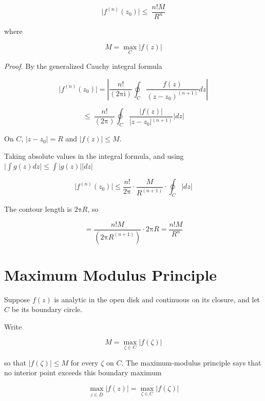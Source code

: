 \documentclass[11pt,a4paper]{article}
\theoremstyle{definition}
\theoremstyle{plain}
\begin{document}
\begin{equation}
\vert{}f^{(n)}(z_{0})\vert{} \le \ \frac{n!M}{R^{n}}
\end{equation}

where

\begin{equation}
M = \max_{C}\vert{}f(z)\vert{}
\end{equation}

\textit{Proof.} By the generalized Cauchy integral formula

\[
\vert{}f^{(n)}(z_{0})\vert{} = \left\vert{}\frac{n!}{(2\mathrm{\pi}\mathrm{i})}\oint_{C}\frac{f(z)}{(z - z_{0})^{(n + 1)}}dz\right\vert{}
\]

\[
\le \ \frac{n!}{(2\mathrm{\pi})}\oint_{C}\frac{\vert{}f(z)\vert{}}{\vert{}z - z_{0}\vert{}^{(n + 1)}}\vert{}dz\vert{}
\]

On $C$, $\vert{}z - z_{0}\vert{} = R$ and $\vert{}f(z)\vert{} \le M$.

Taking absolute values in the integral formula, and using $\vert{}\int g(z)dz\vert{} \le \int\vert{}g(z)\vert{}\vert{}dz\vert{}$

\[
\vert{}f^{(n)}(z_{0})\vert{} \le \frac{n!}{2\mathrm{\pi}} \cdot \frac{M}{R^{(n + 1)}} \cdot \oint_{C}\vert{}dz\vert{}
\]

The contour length is $2\mathrm{\pi}R$, so

\[
= \frac{n!M}{(2\mathrm{\pi}R^{(n + 1)})} \cdot 2\mathrm{\pi}R = \frac{n!M}{R^{n}}
\]

\section{Maximum Modulus Principle}

Suppose $f(z)$ is analytic in the open disk and continuous on its closure, and let $C$ be its boundary circle.

Write

\begin{equation}
M = \max_{\zeta \in C}\vert{}f(\zeta)\vert{}
\end{equation}

so that $\vert{}f(\zeta)\vert{} \le M$ for every $\zeta$ on $C$. The maximum-modulus
principle says that no interior point exceeds this boundary maximum

\begin{equation}
\max_{z \in \bar{D}}\vert{}f(z)\vert{} = \max_{\zeta \in C}\vert{}f(\zeta)\vert{}
\end{equation}
\end{document}
